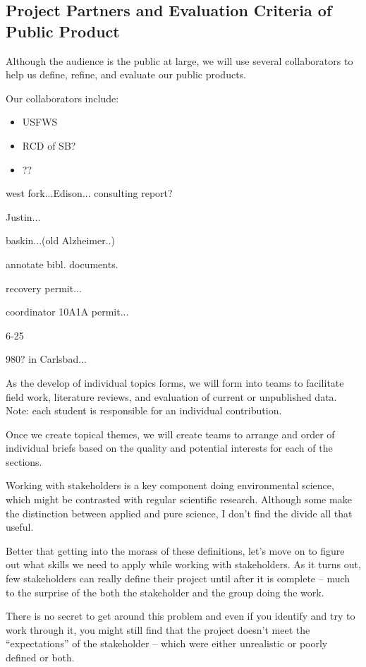 \documentclass{tufte-handout}\usepackage[]{graphicx}\usepackage[]{color}
\begin{document}
\subsection{Project Partners and Evaluation Criteria of Public Product}

Although the audience is the public at large, we will use several collaborators to help us define, refine, and evaluate our public products.  

Our collaborators include: 

\begin{itemize}
  \item USFWS
  \item RCD of SB?
  \item ??
\end{itemize}

west fork...Edison... consulting report?



Justin...

baskin...(old Alzheimer..)

annotate bibl. documents.

recovery permit...

coordinator 10A1A permit...

6-25


980? in Carlsbad...

As the develop of individual topics forms, we will form into teams to facilitate field work, literature reviews, and evaluation of current or unpublished data. Note: each student is responsible for an individual contribution. 

Once we create topical themes, we will create teams to arrange and order of  individual briefs based on the quality and potential interests for each of the sections.  

Working with stakeholders is a key component doing environmental science, which might be contrasted with regular scientific research. Although some make the distinction between applied and pure science, I don't find the divide all that useful. 

Better that getting into the morass of these definitions, let's move on to figure out what skills we need to apply while working with stakeholders. As it turns out, few stakeholders can really define their project until after it is complete -- much to the surprise of the both the stakeholder and the group doing the work. 

There is no secret to get around this problem and even if you identify and try to work through it, you might still find that the project doesn't meet the ``expectations'' of the stakeholder -- which were either unrealistic or poorly defined or both.
\end{document}
